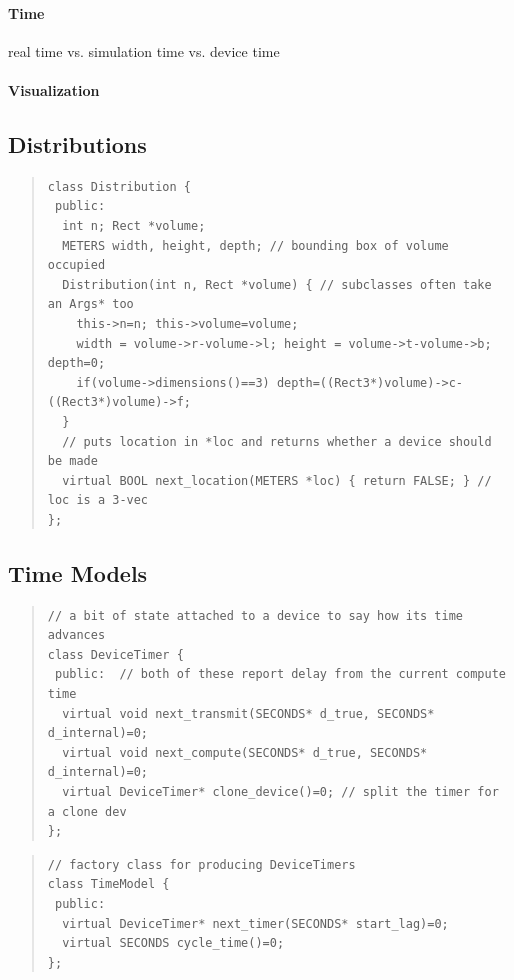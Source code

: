 \documentclass{article}
\begin{document}
\paragraph{Time}
real time vs. simulation time vs. device time

\paragraph{Visualization}

\subsection{Distributions}

\begin{quote}
\begin{verbatim}
class Distribution {
 public:
  int n; Rect *volume;
  METERS width, height, depth; // bounding box of volume occupied
  Distribution(int n, Rect *volume) { // subclasses often take an Args* too
    this->n=n; this->volume=volume;
    width = volume->r-volume->l; height = volume->t-volume->b; depth=0;
    if(volume->dimensions()==3) depth=((Rect3*)volume)->c-((Rect3*)volume)->f;
  }
  // puts location in *loc and returns whether a device should be made
  virtual BOOL next_location(METERS *loc) { return FALSE; } // loc is a 3-vec
};
\end{verbatim}
\end{quote}

\subsection{Time Models}

\begin{quote}
\begin{verbatim}
// a bit of state attached to a device to say how its time advances
class DeviceTimer {
 public:  // both of these report delay from the current compute time
  virtual void next_transmit(SECONDS* d_true, SECONDS* d_internal)=0;
  virtual void next_compute(SECONDS* d_true, SECONDS* d_internal)=0;
  virtual DeviceTimer* clone_device()=0; // split the timer for a clone dev
};
\end{verbatim}
\end{quote}

\begin{quote}
\begin{verbatim}
// factory class for producing DeviceTimers
class TimeModel {
 public:
  virtual DeviceTimer* next_timer(SECONDS* start_lag)=0;
  virtual SECONDS cycle_time()=0;
};
\end{verbatim}
\end{quote}
\end{document}

